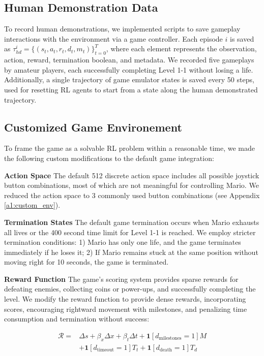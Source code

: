 \documentclass{article}
\begin{document}
\subsection{Human Demonstration Data}
To record human demonstrations, we implemented scripts to save gameplay 
interactions with the environment via a game controller. Each episode $i$ is 
saved as $\tau_{hd}^{i} = \{(s_t, a_t, r_t, d_t, m_t)\}_{t=0}^{T}$, where each 
element represents the observation, action, reward, termination boolean, and 
metadata. We recorded five gameplays by amateur players, each successfully 
completing Level 1-1 without losing a life. Additionally, a single trajectory 
of game emulator states is saved every 50 steps, used for resetting RL agents 
to start from a state along the human demonstrated trajectory.

\subsection{Customized Game Environement}

To frame the game as a solvable RL problem within a reasonable time, we made 
the following custom modifications to the default game integration:

\textbf{Action Space} 
The default 512 discrete action space includes all possible joystick button 
combinations, most of which are not meaningful for controlling Mario. We 
reduced the action space to 3 commonly used button combinations (see 
Appendix \ref{a1:custom_env}).

\textbf{Termination States}
The default game termination occurs when Mario exhausts all lives or the 400 
second time limit for Level 1-1 is reached. We employ stricter termination 
conditions: 1) Mario has only one life, and the game terminates immediately if 
he loses it; 2) If Mario remains stuck at the same position without moving 
right for 10 seconds, the game is terminated.

\textbf{Reward Function}
The game's scoring system provides sparse rewards for defeating enemies, 
collecting coins or power-ups, and successfully completing the level.
We modify the reward function to provide dense rewards, incorporating scores, 
encouraging rightward movement with milestones, and penalizing time consumption 
and termination without success:

\begin{align*}
      \mathcal{R} = &\Delta s + \beta_x \Delta x + \beta_t \Delta t + \mathbf{1}[d_{\text{milestones}} = 1] M\\
      & + \mathbf{1}[d_{\text{timeout}} = 1] T_t + \mathbf{1}[d_{\text{death}} = 1] T_d
\end{align*}
\end{document}
